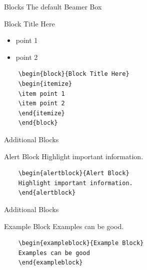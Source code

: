 \documentclass[compress]{beamer}
\begin{document}
\begin{frame}[containsverbatim]{Blocks}
	The default Beamer Box
	\begin{block}{Block Title Here}
		\begin{itemize}
			\item point 1
			\item point 2
		\end{itemize}
	\end{block}
	\begin{lstlisting}
	\begin{block}{Block Title Here}
	\begin{itemize}
	\item point 1
	\item point 2
	\end{itemize}
	\end{block}
	\end{lstlisting}
\end{frame}


\begin{frame}[containsverbatim]{Additional Blocks}
	\begin{alertblock}{Alert Block}
		Highlight important information.
	\end{alertblock}
	\begin{lstlisting}
	\begin{alertblock}{Alert Block}
	Highlight important information.
	\end{alertblock}
	\end{lstlisting}
	
\end{frame}


\begin{frame}[containsverbatim]{Additional Blocks}
	
	\begin{exampleblock}{Example Block}
		Examples can be good.
	\end{exampleblock}
	\begin{lstlisting}
	\begin{exampleblock}{Example Block}
	Examples can be good
	\end{exampleblock}
	\end{lstlisting}
\end{frame}
\end{document}
